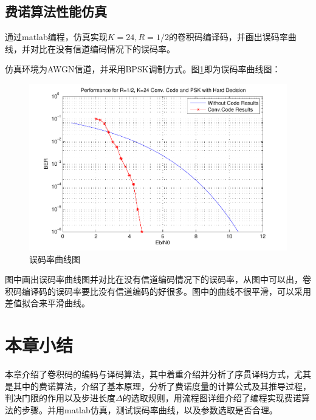 \subsection{费诺算法性能仿真}
通过matlab编程，仿真实现$K=24,R=1/2$的卷积码编译码，并画出误码率曲线，并对比在没有信道编码情况下的误码率。

仿真环境为AWGN信道，并采用BPSK调制方式。图\ref{fig:3.6}即为误码率曲线图：
\begin{figure}[htb]
  \begin{center}
    \includegraphics[width=\textwidth]{images/conv6.pdf}
  \end{center}
  \caption{误码率曲线图}
  \label{fig:3.6}
\end{figure}
图中画出误码率曲线图并对比在没有信道编码情况下的误码率，从图中可以出，卷积码编译码的误码率要比没有信道编码的好很多。图中的曲线不很平滑，可以采用差值拟合来平滑曲线。
\section{本章小结}
本章介绍了卷积码的编码与译码算法，其中着重介绍并分析了序贯译码方式，尤其是其中的费诺算法，介绍了基本原理，分析了费诺度量的计算公式及其推导过程，判决门限的作用以及步进长度$\Delta$的选取规则，用流程图详细介绍了编程实现费诺算法的步骤。并用matlab仿真，测试误码率曲线，以及参数选取是否合理。
%
